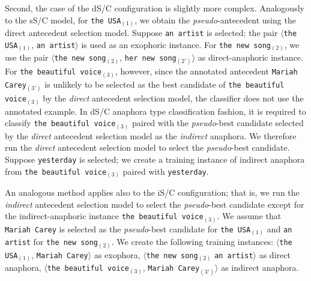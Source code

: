 \documentclass[english]{jnlp_1.4}
\begin{document}
Second, the case of the dS/C configuration is slightly more
complex. Analogously to the sS/C model, for \texttt{the USA}$_{(1)}$,
we obtain the \emph{pseudo}-antecedent using the direct antecedent
selection model. Suppose \texttt{an artist} is selected; the pair
$\langle$\texttt{the USA}$_{(1)}$, \texttt{an artist}$\rangle$ is used
as an exophoric instance. For \texttt{the new song$_{(2)}$}, we use
the pair $\langle$\texttt{the new song$_{(2)}$}, \texttt{her new
  song$_{(2')}$}$\rangle$ as direct-anaphoric instance. For
\texttt{the beautiful voice$_{(3)}$}, however, since the annotated
antecedent \texttt{Mariah Carey$_{(3')}$} is unlikely to be selected
as the best candidate of \texttt{the beautiful voice$_{(3)}$} by the
\emph{direct} antecedent selection model, the classifier does not use
the annotated example. In dS/C anaphora type classification fashion,
it is required to classify \texttt{the beautiful voice$_{(3)}$} paired
with the \emph{pseudo}-best candidate selected by the \emph{direct} antecedent
selection model as the \emph{indirect} anaphora. We therefore run the
\emph{direct} antecedent selection model to select the
\emph{pseudo}-best candidate. Suppose \texttt{yesterday} is selected;
we create a training instance of indirect anaphora from \texttt{the
  beautiful voice}$_{(3)}$ paired with \texttt{yesterday}.

An analogous method applies also to the iS/C configuration; that is, we
run the \emph{indirect} antecedent selection model to select the
\emph{pseudo}-best candidate except for the indirect-anaphoric instance
\texttt{the beautiful voice}$_{(3)}$. We assume that \texttt{Mariah
  Carey} is selected as the \emph{pseudo}-best candidate for
\texttt{the USA$_{(1)}$} and \texttt{an artist} for \texttt{the new
  song$_{(2)}$}. We create the following training instances:
$\langle$\texttt{the USA$_{(1)}$}, \texttt{Mariah Carey}$\rangle$ as
exophora, $\langle$\texttt{the new song$_{(2)}$} \texttt{an
  artist}$\rangle$ as direct anaphora, $\langle$\texttt{the beautiful
  voice}$_{(3)}$, \texttt{Mariah Carey$_{(3')}$}$\rangle$ as indirect
anaphora.
\end{document}
